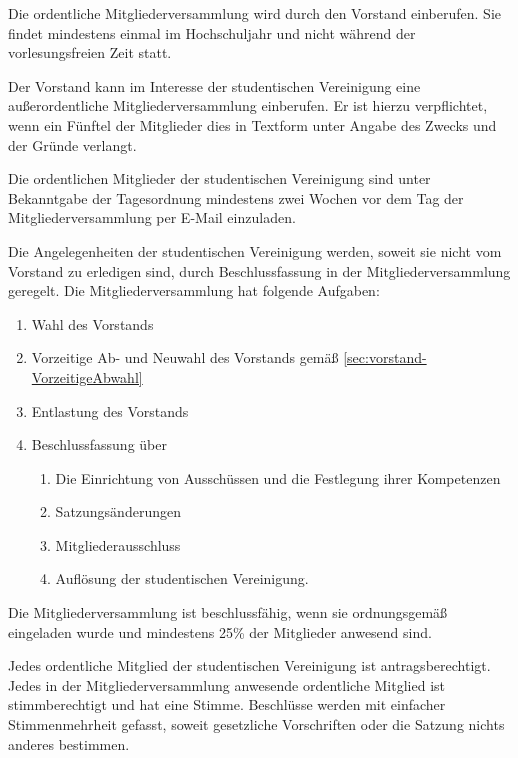 \begin{contract}
\label{sec:mitgliederversammlung}

Die ordentliche Mitgliederversammlung wird durch den Vorstand einberufen. Sie findet mindestens einmal im Hochschuljahr und nicht während der vorlesungsfreien Zeit statt. 

Der Vorstand kann im Interesse der studentischen Vereinigung eine außerordentliche Mitgliederversammlung einberufen. Er ist hierzu verpflichtet, wenn ein Fünftel der Mitglieder dies in Textform unter Angabe des Zwecks und der Gründe verlangt. 

Die ordentlichen Mitglieder der studentischen Vereinigung sind unter Bekanntgabe der Tagesordnung mindestens zwei Wochen vor dem Tag der Mitgliederversammlung per E-Mail einzuladen.

\label{sec:aufgabenMitgliederversammlung}

Die Angelegenheiten der studentischen Vereinigung werden, soweit sie nicht vom Vorstand zu erledigen sind, durch Beschlussfassung in der Mitgliederversammlung geregelt.
Die Mitgliederversammlung hat folgende Aufgaben:
\begin{enumerate}[label={(\arabic*)}]
    \item Wahl des Vorstands
    \item Vorzeitige Ab- und Neuwahl des Vorstands gemäß \ref{sec:vorstand-VorzeitigeAbwahl}
    \item Entlastung des Vorstands
    \item Beschlussfassung über
    \begin{enumerate}[label={\arabic*.}]
        \item  Die Einrichtung von Ausschüssen und die Festlegung ihrer Kompetenzen
        \item Satzungsänderungen
        \item Mitgliederausschluss
        \item Auflösung der studentischen Vereinigung.
    \end{enumerate}
\end{enumerate}



\label{sec:beschlussfassungMitgliederversammlung}

Die Mitgliederversammlung ist beschlussfähig, wenn sie ordnungsgemäß eingeladen wurde und mindestens 25\% der Mitglieder anwesend sind.

Jedes ordentliche Mitglied der studentischen Vereinigung ist antragsberechtigt. Jedes in der Mitgliederversammlung anwesende ordentliche Mitglied ist stimmberechtigt und hat eine Stimme. Beschlüsse werden mit einfacher Stimmenmehrheit gefasst, soweit gesetzliche Vorschriften oder die Satzung nichts anderes bestimmen.




\end{contract}
